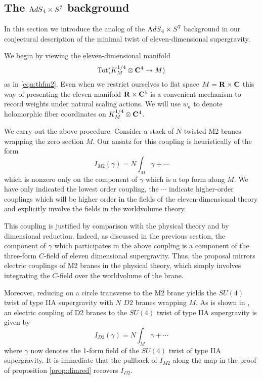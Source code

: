 \documentclass[../main.tex]{subfiles}
\begin{document}
\subsection{The ${\mathrm{A}dS}_4 \times S^7$ background}

In this section we introduce the analog of the ${\mathrm{A}dS}_4 \times S^7$ background in our conjectural description of the minimal twist of eleven-dimensional supergravity. 

\parsec[]

We begin by viewing the eleven-dimensional manifold
\[
\operatorname{Tot}(K^{1/4}_M \otimes \mathbf{C}^4\to M)
\]
as in \eqref{eqn:thfm2}.
Even when we restrict ourselves to flat space $M = \mathbf{R} \times \mathbf{C}$ this way of presenting the eleven-manifold $\mathbf{R} \times \mathbf{C}^5$ is a convenient mechanism to record weights under natural scaling actions. 
We will use $w_a$ to denote holomorphic fiber coordinates on $K^{1/4}_M \otimes \mathbf{C}^4$.

We carry out the above procedure. 
Consider a stack of $N$ twisted M2 branes wrapping the zero section $M$.
Our ansatz for this coupling is heuristically of the form
\[
I_{M2}(\gamma) = N\int_{M} \gamma + \cdots
\] 
which is nonzero only on the component of $\gamma$ which is a top form along $M$.
We have only indicated the lowest order coupling, the $\cdots$ indicate higher-order couplings which will be higher order in the fields of the eleven-dimensional theory and explicitly involve the fields in the worldvolume theory. 

This coupling is justified by comparison with the physical theory and by dimensional reduction. 
Indeed, as discussed in the previous section, the component of $\gamma$ which participates in the above coupling is a component of the three-form $C$-field of eleven dimensional supergravity. 
Thus, the proposal mirrors electric couplings of M2 branes in the physical theory, which simply involves integrating the $C$-field over the worldvolume of the brane. 

Moreover, reducing on a circle transverse to the M2 brane yields the $SU(4)$ twist of type IIA supergravity with $N$ $D2$ branes wrapping $M$. 
As is shown in \cite{CLsugra}, an electric coupling of D2 branes to the $SU(4)$ twist of type IIA supergravity is given by 
\[
I_{D2}(\gamma) = N \int_{M} \gamma + \cdots
\] 
where $\gamma$ now denotes the 1-form field of the $SU(4)$ twist of type IIA supergravity. It is immediate that the pullback of $I_{M2}$ along the map in the proof of proposition \ref{prop:dimred} recovers $I_{D2}$. 
\end{document}
